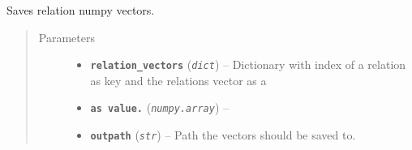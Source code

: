 \documentclass[letterpaper,10pt,english]{sphinxmanual}
\begin{document}
\begin{fulllineitems}
\label{src.trans_e:src.trans_e.trans_we.dump_relation_vectors}
Saves relation numpy vectors.
\begin{quote}\begin{description}
\item[{Parameters}] \leavevmode\begin{itemize}
\item {} 
\textbf{\texttt{relation\_vectors}} (\emph{\texttt{dict}}) -- Dictionary with index of a relation as key and the relations vector as a

\item {} 
\textbf{\texttt{as value.}} (\emph{\texttt{numpy.array}}) -- 

\item {} 
\textbf{\texttt{outpath}} (\emph{\texttt{str}}) -- Path the vectors should be saved to.

\end{itemize}

\end{description}\end{quote}

\end{fulllineitems}

\end{document}
